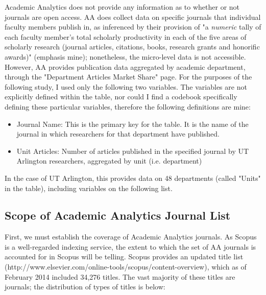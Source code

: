 \documentclass{article}
\begin{document}
Academic Analytics does not provide any information as to whether or not journals are open access. 
AA does collect data on specific journals that individual faculty members publish in, as inferenced by their provision of "a \textit{numeric} tally of each faculty member’s total scholarly productivity in each of the five areas of scholarly research (journal articles, citations, books, research grants and honorific awards)" (emphasis mine); nonetheless, the micro-level data is not accessible. 
However, AA provides publication data aggregated by academic department, through the "Department Articles Market Share" page. 
For the purposes of the following study, I used only the following two variables.                             
The variables are not explicitly defined within the table, nor could I find a codebook specifically defining these particular variables, therefore the following definitions are mine:
\begin{itemize}
\item Journal Name: This is the primary key for the table. It is the name of the journal in which researchers for that department have published.
\item Unit Articles: Number of articles published in the specified journal by UT Arlington researchers, aggregated by unit (i.e. department)
\end{itemize}

 In the case of UT Arlington, this provides data on 48 departments (called "Units" in the table), including variables on the following list. 


\subsection{Scope of Academic Analytics Journal List}
First, we must establish the coverage of Academic Analytics journals. 
As Scopus is a well-regarded indexing service, the extent to which the set of AA journals is accounted for in Scopus will be telling.
Scopus provides an updated title list (http://www.elsevier.com/online-tools/scopus/content-overview), which as of February 2014 included 34,276 titles. 
The vast majority of these titles are journals; the distribution of types of titles is below:

\begin{center}
\end{center}
\end{document}
